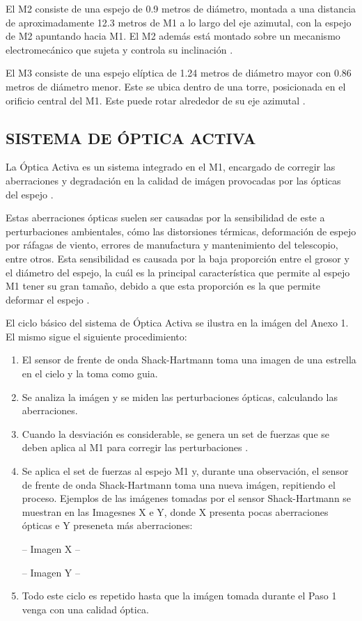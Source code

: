 El M2 consiste de una espejo de 0.9 metros de diámetro, montada a una distancia de aproximadamente 12.3 metros de M1 a lo largo del eje azimutal, con la espejo de M2 apuntando hacia M1. El M2 además está montado sobre un mecanismo electromecánico que sujeta y controla su inclinación \cite{eso2011m2}.

El M3 consiste de una espejo elíptica de 1.24 metros de diámetro mayor con 0.86 metros de diámetro menor. Este se ubica dentro de una torre, posicionada en el orificio central del M1. Este puede rotar alrededor de su eje azimutal \cite{eso2011m1}.

\subsection{SISTEMA DE ÓPTICA ACTIVA}
La Óptica Activa es un sistema integrado en el M1, encargado de corregir las aberraciones y degradación en la calidad de imágen provocadas por las ópticas del espejo \cite{eso1998vlt}.

Estas aberraciones ópticas suelen ser causadas por la sensibilidad de este a perturbaciones ambientales, cómo las distorsiones térmicas, deformación de espejo por ráfagas de viento, errores de manufactura y mantenimiento del telescopio, entre otros. Esta sensibilidad es causada por la baja proporción entre el grosor y el diámetro del espejo, la cuál es la principal característica que permite al espejo M1 tener su gran tamaño, debido a que esta proporción es la que permite deformar el espejo \cite{wilson1987active}.

El ciclo básico del sistema de Óptica Activa se ilustra en la imágen del Anexo 1. El mismo sigue el siguiente procedimiento:

\begin{enumerate}
    \item El sensor de frente de onda Shack-Hartmann toma una imagen de una estrella en el cielo y la toma como guia\cite{eso1998vlt}.

    \item Se analiza la imágen y se miden las perturbaciones ópticas, calculando las aberraciones\cite{wilson1987active}.

    \item Cuando la desviación es considerable, se genera un set de fuerzas que se deben aplica al M1 para corregir las perturbaciones \cite{wilson1987active}.

    \item Se aplica el set de fuerzas al espejo M1 y, durante una observación, el sensor de frente de onda Shack-Hartmann toma una nueva imágen, repitiendo el proceso\cite{wilson1987active}. Ejemplos de las imágenes tomadas por el sensor Shack-Hartmann se muestran en las Imagesnes X e Y, donde X presenta pocas aberraciones ópticas e Y preseneta más aberraciones:

    -- Imagen X --

    -- Imagen Y --

     \item Todo este ciclo es repetido hasta que la imágen tomada durante el Paso 1 venga con una calidad óptica\cite{wilson1987active}.

\end{enumerate}

